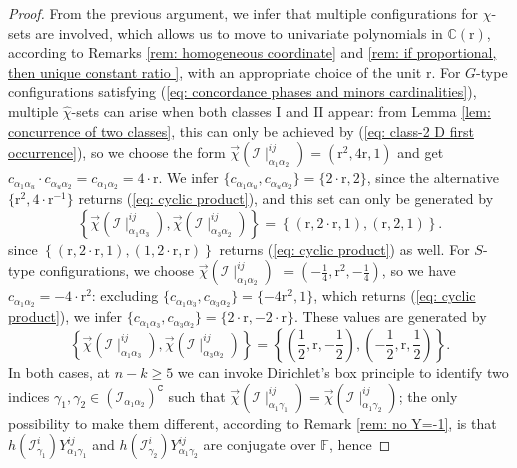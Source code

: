 \documentclass[10pt]{article}
\theoremstyle{remark}%
\theoremstyle{definition}%
\begin{document}
\begin{proof}
From the previous argument, we infer that multiple configurations for $\hat{\chi}$-sets
are involved, which allows us to move to univariate polynomials in $\mathbb{C}(\mathrm{r})$, according to Remarks \ref{rem: homogeneous coordinate} and \ref{rem: if proportional, then unique constant ratio }, with an appropriate choice of the unit $\mathrm{r}$. For $G$-type configurations satisfying (\ref{eq: concordance phases and minors cardinalities}), multiple $\hat{\chi}$-sets can arise when both classes $\mathrm{I}$ and $\mathrm{II}$ appear: from Lemma \ref{lem: concurrence of two classes}, this can only be achieved by (\ref{eq: class-2 D first occurrence}), so we choose the form $\overrightarrow{\chi}(\mathcal{I}\mid_{\alpha_{1}\alpha_{2}}^{ij})=(\mathrm{r}^{2},4\mathrm{r},1)$ and get $c_{\alpha_{1}\alpha_{u}}\cdot c_{\alpha_{u}\alpha_{2}}=c_{\alpha_{1}\alpha_{2}}=4\cdot\mathrm{r}$. We infer $\{c_{\alpha_{1}\alpha_{u}},c_{\alpha_{u}\alpha_{2}}\}=\{2\cdot\mathrm{r},2\}$, 
since the alternative $\{\mathrm{r}^{2},4\cdot\mathrm{r}^{-1}\}$ returns (\ref{eq: cyclic product}), and this set can only be generated by 
\begin{equation} 
    \left\{\overrightarrow{\chi}(\mathcal{I}\mid_{\alpha_{1}\alpha_{3}}^{ij}),\overrightarrow{\chi}(\mathcal{I}\mid_{\alpha_{3}\alpha_{2}}^{ij})\right\}=\left\{(\mathrm{r},2\cdot\mathrm{r},1),(\mathrm{r},2,1)\right\}. 
    \label{eq: G-type extremal combination}
\end{equation}
since $\left\{(\mathrm{r},2\cdot\mathrm{r},1),(1,2\cdot \mathrm{r},\mathrm{r})\right\}$ returns (\ref{eq: cyclic product}) as well. 
For $S$-type configurations, we choose $\overrightarrow{\chi}(\mathcal{I}\mid_{\alpha_{1}\alpha_{2}}^{ij})$ $=(-\frac{1}{4},\mathrm{r}^{2},-\frac{1}{4})$, so we have $c_{\alpha_{1}\alpha_{2}}=-4\cdot\mathrm{r}^{2}$: excluding $\{c_{\alpha_{1}\alpha_{3}},c_{\alpha_{3}\alpha_{2}}\}=\{-4\mathrm{r^{2}},1\}$, which returns (\ref{eq: cyclic product}), we infer $\{c_{\alpha_{1}\alpha_{3}},c_{\alpha_{3}\alpha_{2}}\}=\{2\cdot\mathrm{r},-2\cdot\mathrm{r}\}$. These values are generated by 
\begin{equation} 
    \left\{\overrightarrow{\chi}(\mathcal{I}\mid_{\alpha_{1}\alpha_{3}}^{ij}),\overrightarrow{\chi}(\mathcal{I}\mid_{\alpha_{3}\alpha_{2}}^{ij})\right\}=\left\{\left(\frac{1}{2},\mathrm{r},-\frac{1}{2}\right),\left(-\frac{1}{2},\mathrm{r},\frac{1}{2}\right)\right\}.
    \label{eq: S-type extremal combination}
\end{equation}
In both cases, at $n-k\geq 5$ we can invoke Dirichlet's box principle to identify two indices $\gamma_{1},\gamma_{2}\in (\mathcal{I}_{\alpha_{1}\alpha_{2}})^{\mathtt{C}}$ such that $\overrightarrow{\chi}(\mathcal{I}\mid_{\alpha_{1}\gamma_{1}}^{ij})=\overrightarrow{\chi}(\mathcal{I}\mid_{\alpha_{1}\gamma_{2}}^{ij})$; the only possibility to make them different, according to Remark \ref{rem: no Y=-1}, is that $h(\mathcal{I}_{\gamma_{1}}^{i})Y_{\alpha_{1}\gamma_{1}}^{ij}$ and $h(\mathcal{I}_{\gamma_{2}}^{i})Y_{\alpha_{1}\gamma_{2}}^{ij}$ are conjugate over $\mathbb{F}$, hence 

\end{proof}
\end{document}

